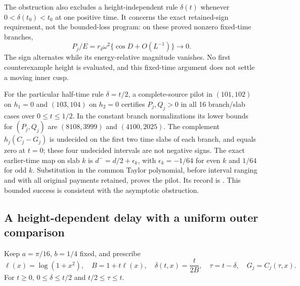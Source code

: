 \documentclass[11pt]{article}
\numberwithin{equation}{section}
\theoremstyle{definition}
\theoremstyle{remark}
\begin{document}
The obstruction also excludes a height-independent rule $\delta(t)$
whenever $0<\delta(t_0)<t_0$ at one positive time.  It concerns the
exact retained-sign requirement, not the bounded-loss program: on these
proved nonzero fixed-time branches,
\[
 P_j/E=r_\delta\omega^2\{\cos D+O(L^{-1})\}\longrightarrow0.
\]
The sign alternates while its energy-relative magnitude vanishes.
No first counterexample height is evaluated, and this fixed-time argument
does not settle a moving inner cusp.

For the particular half-time rule $\delta=t/2$, a complete-source pilot
in $(101,102)$ on $h_1=0$ and $(103,104)$ on $h_2=0$ certifies
$P_j,Q_j>0$ in all 16 branch/slab cases over $0\le t\le1/2$.
In the constant branch normalizations its lower bounds for $(P_j,Q_j)$
are $(8108,3999)$ and $(4100,2025)$.  The complement $h_j(C_j-G_j)$
is undecided on the first two time slabs of each branch, and equals zero
at $t=0$; these four undecided intervals are not negative signs.
The exact earlier-time map on slab $k$ is
$d^-=d/2+\epsilon_k$, with $\epsilon_k=-1/64$ for even $k$ and
$1/64$ for odd $k$.  Substitution in the common Taylor polynomial,
before interval ranging and with all original payments retained, proves
the pilot.  Its record is
.
This bounded success is consistent with the asymptotic obstruction.

\subsection{A height-dependent delay with a uniform outer comparison}
\label{subsec:phase-controlled-delay}

Keep $a=\pi/16$, $b=1/4$ fixed, and prescribe
\begin{equation}
 \ell(x)=\log(1+x^2),\quad B=1+t\ell(x),\quad
 \delta(t,x)=\frac{t}{2B},\quad\tau=t-\delta,
 \quad G_j=C_j(\tau,x).
 \label{eq:smooth-delay-rule}
\end{equation}
For $t\ge0$, $0\le\delta\le t/2$ and $t/2\le\tau\le t$.
\end{document}

